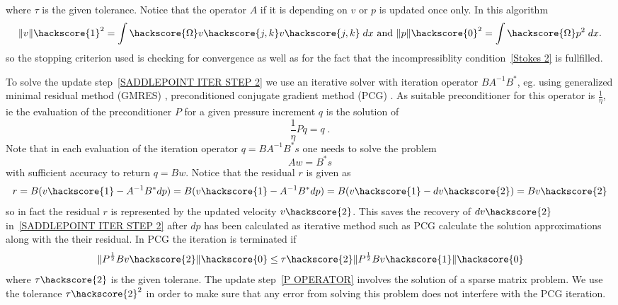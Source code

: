 where $\tau$ is the given tolerance. Notice that the operator $A$ if it is depending on $v$ or $p$ is updated once only. In this algorithm 
\begin{equation}
\|v\|\hackscore{1}^2 = \int\hackscore{\Omega} v\hackscore{j,k}v\hackscore{j,k} \; dx 
\mbox{ and }
\|p\|\hackscore{0}^2= \int\hackscore{\Omega} p^2 \; dx.
\label{STOKES STOP}
\end{equation}
so the stopping criterion used is checking for convergence as well as for 
the fact that the incompressiblity condition~\ref{Stokes 2} is fullfilled.

To solve the update step~\ref{SADDLEPOINT ITER STEP 2} we use an iterative solver with iteration 
operator $B A^{-1} B^{*}$, eg. using generalized minimal residual method (GMRES) , preconditioned conjugate gradient method (PCG) . As suitable preconditioner  for this operator is $\frac{1}{\eta}$, ie 
the evaluation of the preconditioner $P$ for a given pressure increment $q$ is the solution of
\begin{equation} \label{P PREC}
\frac{1}{\eta} Pq = q \; . 
\end{equation}
Note that in each evaluation of the iteration operator $q=B A^{-1} B^{*} s$ one needs to solve
the problem
\begin{equation} \label{P OPERATOR}
A w = B^{*} s 
\end{equation}
with sufficient accuracy to return $q=Bw$. Notice that the residual $r$ is given as
\begin{equation} \label{STOKES RES }
 r= B (v\hackscore{1} -  A^{-1} B^{*} dp) =  B (v\hackscore{1} - A^{-1} B^{*} dp) = B (v\hackscore{1}-dv\hackscore{2}) = B v\hackscore{2}
\end{equation}
so in fact the residual $r$ is represented by the updated velocity $v\hackscore{2}$. This saves the recovery of 
$dv\hackscore{2}$ in~\ref{SADDLEPOINT ITER STEP 2} after $dp$ has been calculated as iterative method such as PCG calculate the solution approximations along with the their residual. In PCG the iteration is terminated if
\begin{equation} \label{P OPERATOR}
\| P^{\frac{1}{2}}B v\hackscore{2} \|\hackscore{0} \le \tau\hackscore{2} \| P^{\frac{1}{2}}B v\hackscore{1} \|\hackscore{0}
\end{equation}
where $\tau\hackscore{2}$ is the given tolerane. The update step~\ref{P OPERATOR} involves the 
solution of a sparse matrix problem. We use the tolerance $\tau\hackscore{2}^2$ in order to make sure that any
error from solving this problem does not interfere with the PCG iteration.




